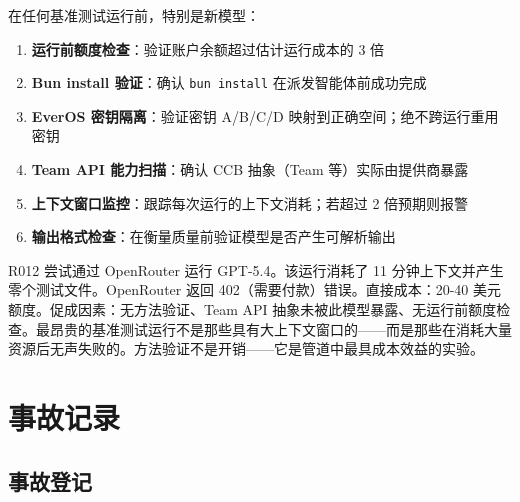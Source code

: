 \documentclass[11pt, a4paper]{article}
\begin{document}
在任何基准测试运行前，特别是新模型：
\begin{enumerate}
  \item \textbf{运行前额度检查}：验证账户余额超过估计运行成本的 3 倍
  \item \textbf{Bun install 验证}：确认 \texttt{bun install} 在派发智能体前成功完成
  \item \textbf{EverOS 密钥隔离}：验证密钥 A/B/C/D 映射到正确空间；绝不跨运行重用密钥
  \item \textbf{Team API 能力扫描}：确认 CCB 抽象（Team 等）实际由提供商暴露
  \item \textbf{上下文窗口监控}：跟踪每次运行的上下文消耗；若超过 2 倍预期则报警
  \item \textbf{输出格式检查}：在衡量质量前验证模型是否产生可解析输出
\end{enumerate}

\begin{evidence}[R012 事后分析]
R012 尝试通过 OpenRouter 运行 GPT-5.4。该运行消耗了 11 分钟上下文并产生零个测试文件。OpenRouter 返回 402（需要付款）错误。直接成本：20-40 美元额度。促成因素：无方法验证、Team API 抽象未被此模型暴露、无运行前额度检查。最昂贵的基准测试运行不是那些具有大上下文窗口的——而是那些在消耗大量资源后无声失败的。方法验证不是开销——它是管道中最具成本效益的实验。
\end{evidence}

\section{事故记录}

\subsection{事故登记}
\end{document}
